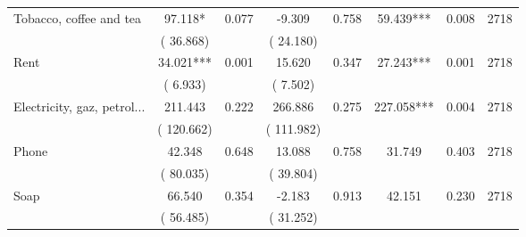 \begin{tabular}{l*{7}{c}}
 Tobacco, coffee and tea       &             97.118*       &        0.077  &             -9.309       &        0.758  &             59.439***       &              0.008 &  2718 \\ 
                       &       (      36.868)             &                               &       (      24.180)                     &                               &                                               &                                &                      \\ 

 Rent       &             34.021***       &        0.001  &             15.620       &        0.347  &             27.243***       &              0.001 &  2718 \\ 
                       &       (       6.933)             &                               &       (       7.502)                     &                               &                                               &                                &                      \\ 

 Electricity, gaz, petrol...       &            211.443       &        0.222  &            266.886       &        0.275  &            227.058***       &              0.004 &  2718 \\ 
                       &       (     120.662)             &                               &       (     111.982)                     &                               &                                               &                                &                      \\ 

 Phone       &             42.348       &        0.648  &             13.088       &        0.758  &             31.749       &              0.403 &  2718 \\ 
                       &       (      80.035)             &                               &       (      39.804)                     &                               &                                               &                                &                      \\ 

 Soap       &             66.540       &        0.354  &             -2.183       &        0.913  &             42.151       &              0.230 &  2718 \\ 
                       &       (      56.485)             &                               &       (      31.252)                     &                               &                                               &                                &                      \\ 


\end{tabular}
